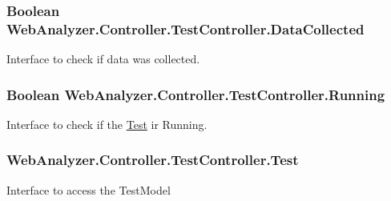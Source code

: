 \subsubsection[{Data\+Collected}]{\setlength{\rightskip}{0pt plus 5cm}Boolean Web\+Analyzer.\+Controller.\+Test\+Controller.\+Data\+Collected\hspace{0.3cm}{\ttfamily [get]}}\label{class_web_analyzer_1_1_controller_1_1_test_controller_a741cf98b95422a4a307bf8834db147b3}


Interface to check if data was collected. 

\hypertarget{class_web_analyzer_1_1_controller_1_1_test_controller_a4020785450ade4a26f603d667ce633d6}{}
\subsubsection[{Running}]{\setlength{\rightskip}{0pt plus 5cm}Boolean Web\+Analyzer.\+Controller.\+Test\+Controller.\+Running\hspace{0.3cm}{\ttfamily [get]}}\label{class_web_analyzer_1_1_controller_1_1_test_controller_a4020785450ade4a26f603d667ce633d6}


Interface to check if the \hyperlink{namespace_web_analyzer_1_1_test}{Test} ir Running. 

\hypertarget{class_web_analyzer_1_1_controller_1_1_test_controller_afcf9572f80c31e6d9aca33f96e3aaa4f}{}
\subsubsection[{Test}]{ Web\+Analyzer.\+Controller.\+Test\+Controller.\+Test\hspace{0.3cm}{\ttfamily [get]}}\label{class_web_analyzer_1_1_controller_1_1_test_controller_afcf9572f80c31e6d9aca33f96e3aaa4f}


Interface to access the Test\+Model 

\hypertarget{class_web_analyzer_1_1_controller_1_1_test_controller_adc0db19e3cc5958f24dd5fd09ce34d98}{}

